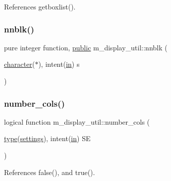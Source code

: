References getboxlist().

\mbox{\label{namespacem__display__util_a03c9a1c990a26433230412d78fa46999}} 
\subsubsection{\texorpdfstring{nnblk()}{nnblk()}}
{\footnotesize\ttfamily pure integer function, \hyperlink{M__stopwatch_83_8txt_a2f74811300c361e53b430611a7d1769f}{public} m\+\_\+display\+\_\+util\+::nnblk (\begin{DoxyParamCaption}\item[{\hyperlink{option__stopwatch_83_8txt_abd4b21fbbd175834027b5224bfe97e66}{character}($\ast$), intent(\hyperlink{M__journal_83_8txt_afce72651d1eed785a2132bee863b2f38}{in})}]{s }\end{DoxyParamCaption})}

\mbox{\label{namespacem__display__util_a837cfbf5c0d097da743220ac0acfaec8}} 
\subsubsection{\texorpdfstring{number\+\_\+cols()}{number\_cols()}}
{\footnotesize\ttfamily logical function m\+\_\+display\+\_\+util\+::number\+\_\+cols (\begin{DoxyParamCaption}\item[{\hyperlink{stop__watch_83_8txt_a70f0ead91c32e25323c03265aa302c1c}{type}(\hyperlink{structm__display__util_1_1settings}{settings}), intent(\hyperlink{M__journal_83_8txt_afce72651d1eed785a2132bee863b2f38}{in})}]{SE }\end{DoxyParamCaption})\hspace{0.3cm}{\ttfamily [private]}}



References false(), and true().

\mbox{\label{namespacem__display__util_a7a886d21010f7a6f0f8101d2b26fd97d}} 
